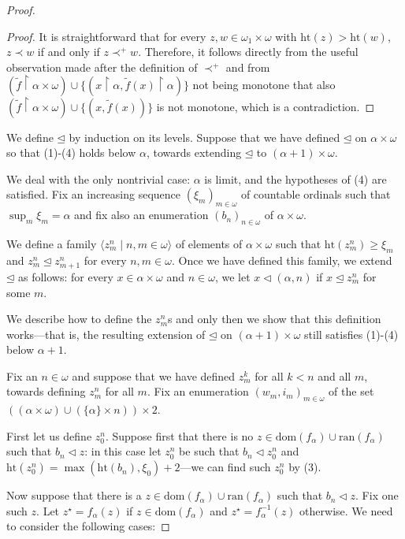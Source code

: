 \documentclass[12pt]{amsart}
\theoremstyle{definition}
\theoremstyle{remark}
\begin{document}
\begin{proof}
\begin{proof}
It is straightforward that for every $z,w \in \omega_1\times \omega$ with $\mathrm{ht}(z) > \mathrm{ht}(w)$, $z \prec w$ if and only if $z \prec^+ w$. Therefore, it follows directly from the useful observation made after the definition of $\prec^+$ and from $(\tilde{f} \upharpoonright \alpha \times \omega) \cup \{(x \upharpoonright \alpha, \tilde{f}(x) \upharpoonright \alpha)\}$ not being monotone that also $(\tilde{f} \upharpoonright \alpha \times \omega) \cup \{(x, \tilde{f}(x))\}$ is not monotone, which is a contradiction.
\end{proof}

We define $\unlhd$ by induction on its levels. Suppose that we have defined $\unlhd$ on $\alpha \times \omega$ so that (1)-(4) holds below $\alpha$, towards extending $\unlhd$ to $(\alpha+1) \times \omega$.

We deal with the only nontrivial case: $\alpha$ is limit, and the hypotheses of (4) are satisfied. Fix an increasing sequence $(\xi_m)_{m\in\omega}$ of countable ordinals such that $\sup_m \xi_m = \alpha$ and fix also an enumeration $(b_n)_{n\in\omega}$ of $\alpha \times \omega$.

We define a family $\langle z^n_m \mid n,m\in\omega\rangle$ of elements of $\alpha \times \omega$ such that $\mathrm{ht}(z^n_m) \ge \xi_m$ and $z^n_{m} \unlhd z^n_{m+1}$ for every $n,m\in\omega$. Once we have defined this family, we extend $\unlhd$ as follows: for every $x \in \alpha \times \omega$ and $n\in\omega$, we let $x \lhd (\alpha, n)$ if $x \unlhd z^n_m$ for some $m$.

We describe how to define the $z^{n}_m$s and only then we show that this definition works---that is, the resulting extension of $\unlhd$ on $(\alpha+1) \times \omega$ still satisfies (1)-(4) below $\alpha+1$.

Fix an $n\in\omega$ and suppose that we have defined $z^k_m$ for all $k < n$ and all $m$, towards defining $z^{n}_m$ for all $m$. Fix an enumeration $(w_m, i_m)_{m\in\omega}$ of the set $((\alpha \times \omega) \cup (\{\alpha\} \times n))\times 2$.


First let us define $z_0^n$. Suppose first that there is no $z \in \mathrm{dom}(f_\alpha) \cup \mathrm{ran}(f_\alpha)$ such that  $b_n \lhd z$: in this case let $z_0^n$ be such that $b_n \lhd z_0^n$ and $\mathrm{ht}(z_0^n) = \max(\mathrm{ht}(b_n), \xi_0)+2$---we can find such $z_0^n$ by (3). 

Now suppose that there is a $z \in \mathrm{dom}(f_\alpha) \cup \mathrm{ran}(f_\alpha)$ such that  $b_n \lhd z$. Fix one such $z$. Let $z^\star = f_\alpha(z)$ if $z \in \mathrm{dom}(f_\alpha)$ and $z^\star = f_{\alpha}^{-1}(z)$ otherwise.  We need to consider the following cases:


\end{proof}
\end{document}
